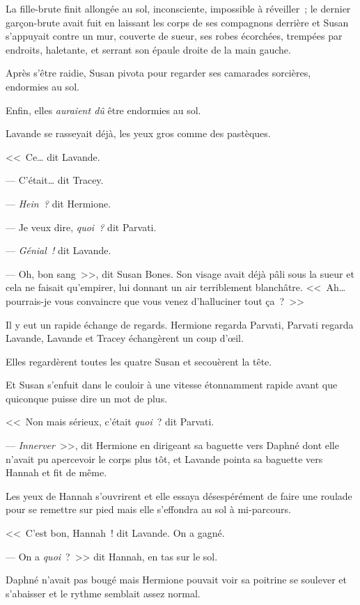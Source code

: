 La fille-brute finit allongée au sol, inconsciente, impossible à réveiller~; le dernier garçon-brute avait fuit en laissant les corps de ses compagnons derrière et Susan s'appuyait contre un mur, couverte de sueur, ses robes écorchées, trempées par endroits, haletante, et serrant son épaule droite de la main gauche.

Après s'être raidie, Susan pivota pour regarder ses camarades sorcières, endormies au sol.

Enfin, elles \emph{auraient dû} être endormies au sol.

Lavande se rasseyait déjà, les yeux gros comme des pastèques.

<<~Ce… dit Lavande.

--- C'était… dit Tracey.

--- \emph{Hein~?} dit Hermione.

--- Je veux dire, \emph{quoi~?} dit Parvati.

--- \emph{Génial~!} dit Lavande.

--- Oh, bon sang~>>, dit Susan Bones. Son visage avait déjà pâli sous la sueur et cela ne faisait qu'empirer, lui donnant un air terriblement blanchâtre. <<~Ah… pourrais-je vous convaincre que vous venez d'halluciner tout ça~?~>>

Il y eut un rapide échange de regards. Hermione regarda Parvati, Parvati regarda Lavande, Lavande et Tracey échangèrent un coup d'œil.

Elles regardèrent toutes les quatre Susan et secouèrent la tête.

Et Susan s'enfuit dans le couloir à une vitesse étonnamment rapide avant que quiconque puisse dire un mot de plus.

<<~Non mais sérieux, c'était \emph{quoi}~? dit Parvati.

--- \emph{Innerver}~>>, dit Hermione en dirigeant sa baguette vers Daphné dont elle n'avait pu apercevoir le corps plus tôt, et Lavande pointa sa baguette vers Hannah et fit de même.

Les yeux de Hannah s'ouvrirent et elle essaya désespérément de faire une roulade pour se remettre sur pied mais elle s'effondra au sol à mi-parcours.

<<~C'est bon, Hannah~! dit Lavande. On a gagné.

--- On a \emph{quoi}~?~>> dit Hannah, en tas sur le sol.

Daphné n'avait pas bougé mais Hermione pouvait voir sa poitrine se soulever et s'abaisser et le rythme semblait assez normal.


